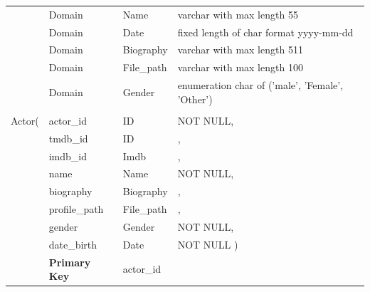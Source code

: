 \documentclass[12pt]{article}
\begin{document}
\begin{table}[H]
\begin{tabular}{l l l l}
		&Domain & Name & varchar with max length 55\\
		&Domain & Date  & fixed length of char format yyyy-mm-dd\\
        &Domain & Biography & varchar with max length 511\\
        &Domain & File\_path	& varchar with max length 100\\
        &Domain & Gender & enumeration char of ('male', 'Female', 'Other')\\&&&
        \\Actor(& actor\_id&ID&NOT NULL,
        \\&tmdb\_id&ID&,
        \\&imdb\_id&Imdb&,
        \\&name&Name&NOT NULL,
        \\&biography&Biography&,
        \\&profile\_path&File\_path&,
        \\&gender&Gender&NOT NULL,
        \\&date\_birth&Date&NOT NULL
        \hspace{4PT} )\\
        &\textbf{Primary Key}& actor\_id&\\
        \hline
	\end{tabular}
\end{table}
\end{document}
